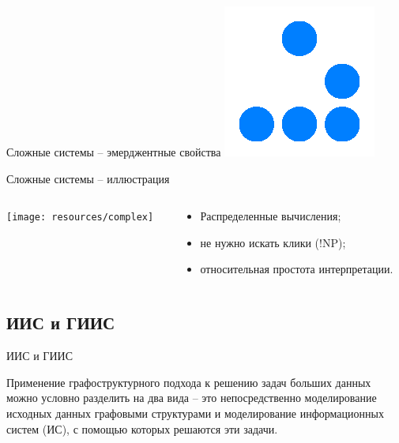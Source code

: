 \documentclass{beamer}
\begin{document}
\begin{darkframes}
\begin{frame}[label=math]{Сложные системы -- эмерджентные свойства}
			\includegraphics[width=0.17\paperwidth]{resources/glider}

		\end{frame}

		\begin{frame}{Сложные системы -- иллюстрация}
			\centering
			\begin{columns}[onlytextwidth]
				\begin{column}{0.6\columnwidth}
					\centering
					 \texttt{[image: resources/complex]}

				\end{column}

				\begin{column}{0.38\columnwidth}
					\centering
					\vspace*{4cm}
					\begin{itemize}
						\item \alert{Распределенные} вычисления;
						\item \alert{не нужно} искать клики (!NP);
						\item относительная \alert{простота} интерпретации.
					\end{itemize}	

				\end{column}
			\end{columns}
		\end{frame}
	
		\subsection{ИИС и ГИИС}
		\begin{frame}{ИИС и ГИИС}

			\begin{block}{}
			\centering
				Применение графоструктурного подхода к решению задач больших данных можно условно разделить на два вида -- это непосредственно моделирование исходных данных графовыми структурами и моделирование информационных систем (ИС), с помощью которых решаются эти задачи.


\end{block}
\end{frame}
\end{darkframes}
\end{document}
